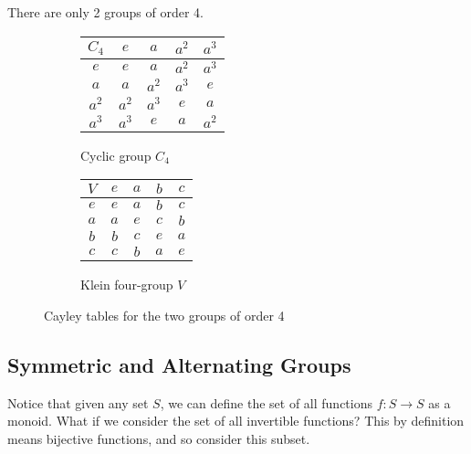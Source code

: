   \begin{example}
    There are only 2 groups of order 4. 
    \begin{figure}[H]
      \centering
      \begin{subfigure}[b]{0.48\textwidth}
        \centering
        \begin{tabular}{|c|c|c|c|c|}
          \hline
          $C_4$ & $e$ & $a$ & $a^2$ & $a^3$ \\
          \hline
          $e$ & $e$ & $a$ & $a^2$ & $a^3$ \\
          \hline
          $a$ & $a$ & $a^2$ & $a^3$ & $e$ \\
          \hline
          $a^2$ & $a^2$ & $a^3$ & $e$ & $a$ \\
          \hline
          $a^3$ & $a^3$ & $e$ & $a$ & $a^2$ \\
          \hline
        \end{tabular}
        \caption{Cyclic group $C_4$}
      \end{subfigure}
      \hfill 
      \begin{subfigure}[b]{0.48\textwidth}
        \centering
        \begin{tabular}{|c|c|c|c|c|}
          \hline
          $V$ & $e$ & $a$ & $b$ & $c$ \\
          \hline
          $e$ & $e$ & $a$ & $b$ & $c$ \\
          \hline
          $a$ & $a$ & $e$ & $c$ & $b$ \\
          \hline
          $b$ & $b$ & $c$ & $e$ & $a$ \\
          \hline
          $c$ & $c$ & $b$ & $a$ & $e$ \\
          \hline
        \end{tabular}
        \caption{Klein four-group $V$}
      \end{subfigure}
      \caption{Cayley tables for the two groups of order 4}
      \label{fig:order4groups}
    \end{figure} 
  \end{example}

\subsection{Symmetric and Alternating Groups}

  Notice that given any set $S$, we can define the set of all functions $f: S \rightarrow S$ as a monoid. What if we consider the set of all invertible functions? This by definition means bijective functions, and so consider this subset.  

